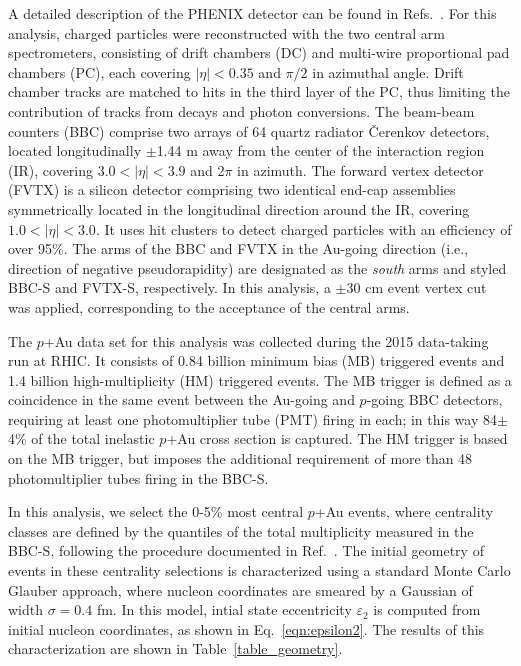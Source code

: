 \documentclass[%
reprint,
showpacs,preprintnumbers,
 amsmath,amssymb,
 aps,
]{revtex4-1}
\newcommand{\pau}{\mbox{$p$+Au}\xspace}
\newcommand{\bbceta}{\mbox{$3.0<|\eta|<3.9$}\xspace}
\begin{document}
A detailed description of the PHENIX detector can be found in Refs.~\cite{Adcox2003469,fvtx}. For this analysis, charged particles were reconstructed with the two central arm spectrometers, consisting of drift chambers (DC) and multi-wire proportional pad chambers (PC), each covering $|\eta|<0.35$ and $\pi/2$ in azimuthal angle. Drift chamber tracks are matched to hits in the third layer of the PC, thus limiting the contribution of tracks from decays and photon conversions. The beam-beam counters (BBC) comprise two arrays of 64 quartz radiator \v{C}erenkov detectors, located longitudinally $\pm$1.44 m away from the center of the interaction region (IR), covering \bbceta and 2$\pi$ in azimuth. The forward vertex detector (FVTX) is a silicon detector comprising two identical end-cap assemblies symmetrically located in the longitudinal direction around the IR, covering $1.0 < |\eta| < 3.0$. It uses hit clusters to detect charged particles with an efficiency of over 95\%.
The arms of the BBC and FVTX in the Au-going direction (i.e., direction of negative pseudorapidity) are designated as the \emph{south} arms and styled BBC-S and FVTX-S, respectively. In this analysis, a $\pm$30 cm event vertex cut was applied, corresponding to the acceptance of the central arms. 

The \pau data set for this analysis was collected during the 2015 data-taking run at RHIC. It consists of 0.84 billion minimum bias (MB) triggered events and 1.4 billion high-multiplicity (HM) triggered events. The MB trigger is defined as a coincidence in the same event between the Au-going and $p$-going BBC detectors, requiring at least one photomultiplier tube (PMT) firing in each; in this way 84$\pm$4\% of the total inelastic \pau cross section is captured. The HM trigger is based on the MB trigger, but imposes the additional requirement of more than 48 photomultiplier tubes firing in the BBC-S. 

In this analysis, we select the 0-5\% most central \pau events, where 
centrality classes are defined by the quantiles of the total multiplicity measured in the BBC-S, following the procedure documented in Ref.~\cite{bbc}.
The initial geometry of events in these centrality selections is characterized using a standard Monte Carlo Glauber approach, where nucleon coordinates are smeared by a Gaussian of width $\sigma = 0.4$ fm. In this model, intial state eccentricity $\varepsilon_2$ is computed from initial nucleon coordinates, as shown in Eq.~\ref{eqn:epsilon2}. The results of this characterization are shown in Table~\ref{table_geometry}.
\end{document}
